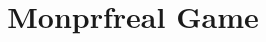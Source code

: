 \documentclass[a4paper,landscape]{article}
\title{Monprfreal Game}
\begin{document}
\maketitle
\begin{center}

\end{center}
\begin{center}

\end{center}
\begin{center}

\end{center}
\end{document}
